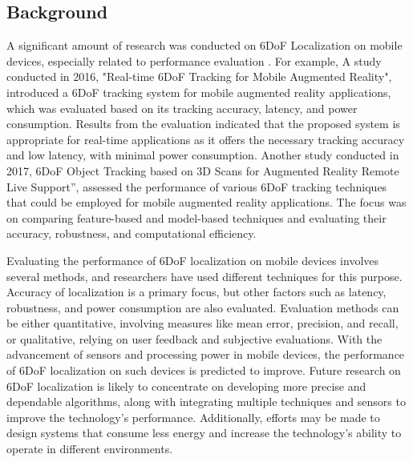 \documentclass[sigconf]{acmart}
\begin{document}
\subsection{Background}
A significant amount of research was conducted on 6DoF Localization on mobile devices, especially related to performance evaluation\cite{benchmarking6dof} . For example, A study conducted in 2016, "Real-time 6DoF Tracking for Mobile Augmented Reality"\cite{6doftrackingmobilear}, introduced a 6DoF tracking system for mobile augmented reality applications, which was evaluated based on its tracking accuracy, latency, and power consumption. Results from the evaluation indicated that the proposed system is appropriate for real-time applications as it offers the necessary tracking accuracy and low latency, with minimal power consumption. Another study conducted in 2017, 6DoF Object Tracking based on 3D Scans for Augmented Reality Remote Live Support”\cite{6dof2017}, assessed the performance of various 6DoF tracking techniques that could be employed for mobile augmented reality applications. The focus was on comparing feature-based and model-based techniques and evaluating their accuracy, robustness, and computational efficiency.


Evaluating the performance of 6DoF localization\cite{benchmarking6dof} on mobile devices involves several methods, and researchers have used different techniques for this purpose. Accuracy of localization is a primary focus, but other factors such as latency, robustness, and power consumption are also evaluated. Evaluation methods can be either quantitative, involving measures like mean error, precision, and recall, or qualitative, relying on user feedback and subjective evaluations. With the advancement of sensors and processing power in mobile devices, the performance of 6DoF localization\cite{benchmarking6dof} on such devices is predicted to improve. Future research on 6DoF localization\cite{6DOFfuturework} is likely to concentrate on developing more precise and dependable algorithms, along with integrating multiple techniques and sensors to improve the technology's performance. Additionally, efforts may be made to design systems that consume less energy and increase the technology's ability to operate in different environments.
\end{document}
